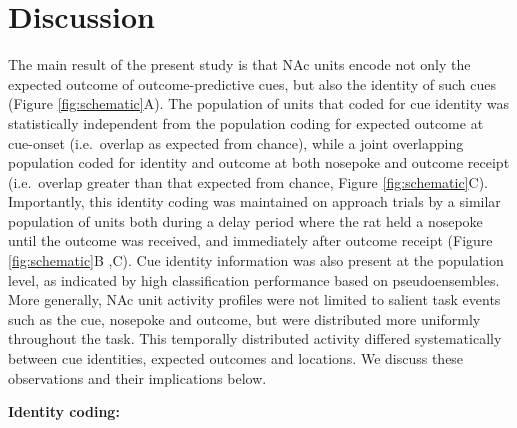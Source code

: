 \documentclass[11pt]{article}
\providecommand{\DIFadd}[1]{{\protect\color{red} \sf #1}} %
\providecommand{\DIFdel}[1]{} %
\providecommand{\DIFaddbegin}{} %
\providecommand{\DIFaddend}{} %
\providecommand{\DIFdelbegin}{} %
\providecommand{\DIFdelend}{} %
\newcommand{\DIFscaledelfig}{0.5}
\newlength{\DIFdelgraphicswidth} %
\newlength{\DIFdelgraphicsheight} %
\newcommand{\DIFaddincludegraphics}[2][]{{\color{red}\fbox{\DIFOincludegraphics[#1]{#2}}}} %
\newcommand{\DIFdelincludegraphics}[2][]{%
\sbox{\DIFdelgraphicsbox}{\DIFOincludegraphics[#1]{#2}}%
\settoboxwidth{\DIFdelgraphicswidth}{\DIFdelgraphicsbox} %
\settoboxtotalheight{\DIFdelgraphicsheight}{\DIFdelgraphicsbox} %
\scalebox{\DIFscaledelfig}{%
\parbox[b]{\DIFdelgraphicswidth}{\usebox{\DIFdelgraphicsbox}\\[-\baselineskip] \rule{\DIFdelgraphicswidth}{0em}}\llap{\resizebox{\DIFdelgraphicswidth}{\DIFdelgraphicsheight}{%
\setlength{\unitlength}{\DIFdelgraphicswidth}%
\begin{picture}(1,1)%
\thicklines\linethickness{2pt} %
{\color[rgb]{1,0,0}\put(0,0){\framebox(1,1){}}}%
{\color[rgb]{1,0,0}\put(0,0){\line( 1,1){1}}}%
{\color[rgb]{1,0,0}\put(0,1){\line(1,-1){1}}}%
\end{picture}%
}\hspace*{3pt}}} %
} %
\DeclareRobustCommand{\DIFaddbegin}{\DIFOaddbegin \let\includegraphics\DIFaddincludegraphics} %
\DeclareRobustCommand{\DIFaddend}{\DIFOaddend \let\includegraphics\DIFOincludegraphics} %
\DeclareRobustCommand{\DIFdelbegin}{\DIFOdelbegin \let\includegraphics\DIFdelincludegraphics} %
\DeclareRobustCommand{\DIFdelend}{\DIFOaddend \let\includegraphics\DIFOincludegraphics} %
\begin{document}
\DIFdelend \section*{Discussion}

The main result of the present study is that NAc units encode not only
the expected outcome of outcome-predictive cues, but also the identity
of such cues \DIFdelbegin \DIFdel{. }\DIFdelend \DIFaddbegin \DIFadd{(Figure \ref{fig:schematic}A). The population of units
that coded for cue identity was statistically independent from the
population coding for expected outcome at cue-onset (i.e.\ overlap as
expected from chance), while a joint overlapping population coded for
identity and outcome at both nosepoke and outcome receipt
(i.e.\ overlap greater than that expected from chance, Figure
\ref{fig:schematic}C). }\DIFaddend Importantly, this identity coding was
maintained on approach trials \DIFaddbegin \DIFadd{by a similar population of units }\DIFaddend both
during a delay period where the rat held a nosepoke until the outcome
was received, \DIFdelbegin \DIFdel{after }\DIFdelend \DIFaddbegin \DIFadd{and }\DIFaddend immediately after outcome receipt (\DIFdelbegin \DIFdel{H2 and H3 in }\DIFdelend Figure
\ref{fig:schematic}B\DIFdelbegin \DIFdel{)}\DIFdelend \DIFaddbegin \DIFadd{,C). Cue identity information was also present at
the population level, as indicated by high classification performance
based on pseudoensembles. More generally, NAc unit activity profiles
were not limited to salient task events such as the cue, nosepoke and
outcome, but were distributed more uniformly throughout the task. This
temporally distributed activity differed systematically between cue
identities, expected outcomes and locations}\DIFaddend . \DIFdelbegin \DIFdel{Units coding for cue identity showed partial
overlap with those coding for expected outcome (H3 in Figure
\ref{fig:schematic}A). Units that coded different cue features
(identity, outcome, location) exhibited different temporal profiles as a whole, although across all recorded units a tiling of task structure
was observed such that all points within our analyzed task space was
accounted for by the ordered peak firing rates of all
units. Furthermore, this tiling differed between various conditions
with a cue
feature, such as light versus sound blocks. }\DIFdelend We discuss these
observations and their implications below.

{\bf \DIFdelbegin \DIFdel{Cue identity}\DIFdelend \DIFaddbegin \DIFadd{Identity coding}\DIFaddend :}
\end{document}
